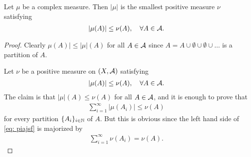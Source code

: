 \begin{theorem}
Let $\mu$ be a complex measure. Then $|\mu|$ is the smallest positive measure $\nu$ satisfying
\begin{align*}
	|\mu(A)| \le \nu(A), \quad \forall A\in \mathcal{A}.
\end{align*}
\end{theorem}
\begin{proof}
Clearly $\mu(A)| \le |\mu|(A)$ for all $A\in \mathcal{A}$ since $A=A\cup\emptyset \cup \emptyset \cup \dots$ is a partition of $A$.

Let $\nu$ be a positive measure on $(X, \mathcal{A})$ satisfying
\begin{align}
	|\mu(A)|\le \nu(A), \quad \forall A\in \mathcal{A}. \label{eq: piajsf}
\end{align}
The claim is that $|\mu|(A)\le \nu(A)$ for all $A\in \mathcal{A}$, and it is enough to prove that
\begin{align*}
	\sum_{i=1}^{\infty}|\mu(A_{i})| \le \nu(A)
\end{align*}
for every partition $\{A_{i}\}_{i\in \mathbb{N}}$ of $A$. But this is obvious since the left hand side of \eqref{eq: piajsf} is majorized by
\begin{align*}
	\sum_{i=1}^{\infty}\nu(A_{i})=\nu(A).
\end{align*}
\end{proof}

